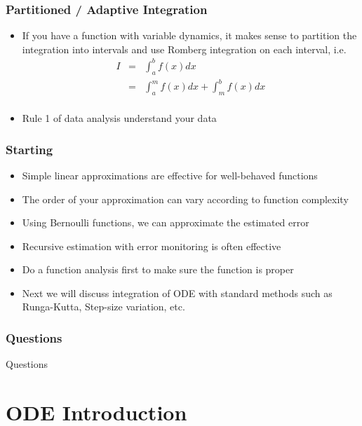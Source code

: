 \documentclass[10pt]{beamer}
\begin{document}
\begin{frame}
  \frametitle{Partitioned / Adaptive Integration}
  \begin{itemize}
  \item If you have a function with variable dynamics, it makes sense
    to partition the integration into intervals and use Romberg
    integration on each interval, i.e.
    \[
      \begin{array}{rcl}
        I & = & \int_a^b f(x) dx \\
          & = & \int_a^m f(x) dx + \int_m^b f(x) dx\\
      \end{array}
    \]
  \item Rule 1 of data analysis understand your data 
  \end{itemize}
\end{frame}

\begin{frame}
  \frametitle{Starting}
  \begin{itemize}
  \item Simple linear approximations are effective for well-behaved functions
  \item The order of your approximation can vary according to function complexity
  \item Using Bernoulli functions, we can approximate the estimated error
  \item Recursive estimation with error monitoring is often effective
  \item Do a function analysis first to make sure the function is proper
  \item Next we will discuss integration of ODE with standard
    methods such as Runga-Kutta, Step-size variation, etc.
  \end{itemize}
\end{frame}

\begin{frame}
  \frametitle{Questions}
  \centerline{\Huge Questions}
\end{frame}


\section{ODE Introduction}
\end{document}
